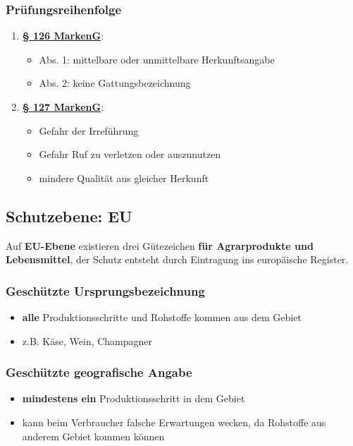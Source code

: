 \documentclass[12pt,A4]{extarticle}
\newcommand{\markenG}[2][]{\textbf{\textcolor{markenGesetzLink}{\href{https://www.gesetze-im-internet.de/markeng/__#2.html}{§ #2 \ifthenelse{\equal{#1}{}}{}{#1 }MarkenG}}}}
\begin{document}
\subsubsection{Prüfungsreihenfolge}
\begin{enumerate}
  \item{\markenG{126}:
              \begin{itemize}
                \item{Abs. 1: mittelbare oder unmittelbare Herkunftsangabe}
                \item{Abs. 2: keine Gattungsbezeichnung}
              \end{itemize}
        }
  \item{\markenG{127}:
              \begin{itemize}
                \item{Gefahr der Irreführung}
                \item{Gefahr Ruf zu verletzen oder auszunutzen}
                \item{mindere Qualität aus gleicher Herkunft}
              \end{itemize}
        }
\end{enumerate}

\subsection{Schutzebene: EU}
Auf \textbf{EU-Ebene} existieren drei Gütezeichen \textbf{für Agrarprodukte und Lebensmittel}, der Schutz entsteht durch Eintragung ins europäische Register.

\subsubsection{Geschützte Ursprungsbezeichnung}
\begin{itemize}
  \item{\textbf{alle} Produktionsschritte und Rohstoffe kommen aus dem Gebiet}
  \item{z.B. Käse, Wein, Champagner}
\end{itemize}

\subsubsection{Geschützte geografische Angabe}
\begin{itemize}
  \item{\textbf{mindestens ein} Produktionsschritt in dem Gebiet}
  \item{kann beim Verbraucher falsche Erwartungen wecken, da Rohstoffe aus anderem Gebiet kommen können}
\end{itemize}
\end{document}
